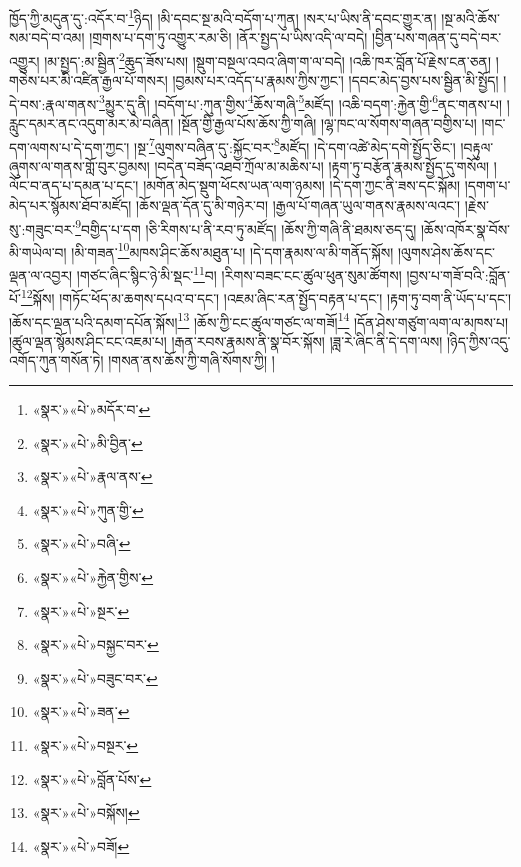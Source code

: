 ཁྱོད་ཀྱི་མདུན་དུ་:འདོར་བ་\footnote{«སྣར་»«པེ་»མདོར་བ་}ཉིད། །མི་དབང་སྔ་མའི་བདོག་པ་ཀུན། །སར་པ་ཡིས་ནི་དབང་གྱུར་ན། །སྔ་མའི་ཆོས་སམ་བདེ་བ་འམ། །གྲགས་པ་དག་ཏུ་འགྱུར་རམ་ཅི། །ནོར་སྤྱད་པ་ཡིས་འདི་ལ་བདེ། །བྱིན་པས་གཞན་དུ་བདེ་བར་འགྱུར། །མ་སྤྱད་:མ་སྦྱིན་\footnote{«སྣར་»«པེ་»མི་བྱིན་}ཆུད་ཟོས་པས། །སྡུག་བསྔལ་འབའ་ཞིག་ག་ལ་བདེ། །འཆི་ཁར་བློན་པོ་རྗེས་ངན་ཅན། །གཅེས་པར་མི་འཛིན་རྒྱལ་པོ་གསར། །བྱམས་པར་འདོད་པ་རྣམས་ཀྱིས་ཀྱང་། །དབང་མེད་བྱས་པས་སྦྱིན་མི་སྤྱོད། །དེ་བས་:རྣལ་གནས་\footnote{«སྣར་»«པེ་»རྣལ་ནས་}མྱུར་དུ་ནི། །བདོག་པ་:ཀུན་གྱིས་\footnote{«སྣར་»«པེ་»ཀུན་གྱི་}ཆོས་གཞི་\footnote{«སྣར་»«པེ་»བཞི་}མཛོད། །འཆི་བདག་:རྐྱེན་གྱི་\footnote{«སྣར་»«པེ་»རྐྱེན་གྱིས་}ནང་གནས་པ། །རླུང་དམར་ནང་འདུག་མར་མེ་བཞིན། །སྔོན་གྱི་རྒྱལ་པོས་ཆོས་ཀྱི་གཞི། །ལྷ་ཁང་ལ་སོགས་གཞན་བགྱིས་པ། །གང་དག་ལགས་པ་དེ་དག་ཀྱང་། །སྔ་\footnote{«སྣར་»«པེ་»སྔར་}ལུགས་བཞིན་དུ་:སྐྱོང་བར་\footnote{«སྣར་»«པེ་»བསྐྱང་བར་}མཛོད། །དེ་དག་འཚེ་མེད་དགེ་སྤྱོད་ཅིང་། །བརྟུལ་ཞུགས་ལ་གནས་གློ་བུར་བྱམས། །བདེན་བཟོད་འཐབ་ཀྲོལ་མ་མཆིས་པ། །རྟག་ཏུ་བརྩོན་རྣམས་སྤྱོད་དུ་གསོལ། །ལོང་བ་ནད་པ་དམན་པ་དང་། །མགོན་མེད་སྡུག་ཕོངས་ཡན་ལག་ཉམས། །དེ་དག་ཀྱང་ནི་ཟས་དང་སྐོམ། །དགག་པ་མེད་པར་སྙོམས་ཐོབ་མཛོད། །ཆོས་ལྡན་དོན་དུ་མི་གཉེར་བ། །རྒྱལ་པོ་གཞན་ཡུལ་གནས་རྣམས་ལའང་། །རྗེས་སུ་:གཟུང་བར་\footnote{«སྣར་»«པེ་»བཟུང་བར་}བགྱིད་པ་དག །ཅི་རིགས་པ་ནི་རབ་ཏུ་མཛོད། །ཆོས་ཀྱི་གཞི་ནི་ཐམས་ཅད་དུ། །ཆོས་འཁོར་སྣ་བོས་མི་གཡེལ་བ། །མི་གཟན་\footnote{«སྣར་»«པེ་»ཟན་}མཁས་ཤིང་ཆོས་མཐུན་པ། །དེ་དག་རྣམས་ལ་མི་གནོད་སྐོས། །ལུགས་ཤེས་ཆོས་དང་ལྡན་ལ་འབྱར། །གཙང་ཞིང་སྙིང་ཉེ་མི་སྡང་\footnote{«སྣར་»«པེ་»བསྔར་}བ། །རིགས་བཟང་ངང་ཚུལ་ཕུན་སུམ་ཚོགས། །བྱས་པ་གཟོ་བའི་:བློན་པོ་\footnote{«སྣར་»«པེ་»བློན་པོས་}སྐོས། །གཏོང་ཕོད་མ་ཆགས་དཔའ་བ་དང་། །འཇམ་ཞིང་རན་སྤྱོད་བརྟན་པ་དང་། །རྟག་ཏུ་བག་ནི་ཡོད་པ་དང་། །ཆོས་དང་ལྡན་པའི་དམག་དཔོན་སྐོས།\footnote{«སྣར་»«པེ་»བསྐོས།} །ཆོས་ཀྱི་ངང་ཚུལ་གཙང་ལ་གཟོ།\footnote{«སྣར་»«པེ་»བཟོ།} །དོན་ཤེས་གཙུག་ལག་ལ་མཁས་པ། །ཚུལ་ལྡན་སྙོམས་ཤིང་ངང་འཇམ་པ། །རྒན་རབས་རྣམས་ནི་སྣ་བོར་སྐོས། །ཟླ་རེ་ཞིང་ནི་དེ་དག་ལས། །ཉིད་ཀྱིས་འདུ་འགོད་ཀུན་གསོན་ཏེ། །གསན་ནས་ཆོས་ཀྱི་གཞི་སོགས་ཀྱི། །
